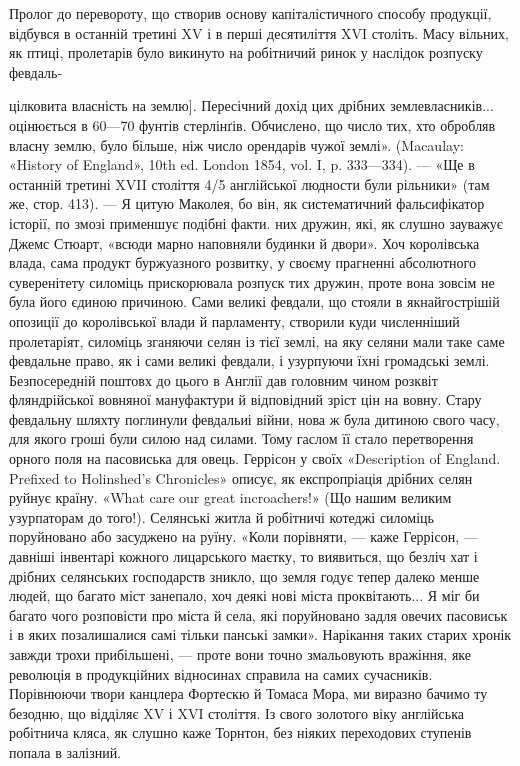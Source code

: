 Пролог до перевороту, що створив основу капіталістичного
способу продукції, відбувся в останній третині XV і в перші
десятиліття XVI століть. Масу вільних, як птиці, пролетарів
було викинуто на робітничий ринок у наслідок розпуску февдаль-

цілковита власність на землю]. Пересічний дохід цих дрібних землевласників...
оцінюється в 60—70 фунтів стерлінґів. Обчислено, що число
тих, хто обробляв власну землю, було більше, ніж число орендарів чужої
землі». (Macaulay: «History of England», 10th ed. London 1854,
vol. I, p. 333—334). — «Ще в останній третині XVII століття 4/5 англійської
людности були рільники» (там же, стор. 413). — Я цитую Маколея,
бо він, як систематичний фальсифікатор історії, по змозі применшує
подібні факти.
них дружин, які, як слушно зауважує Джемс Стюарт, «всюди
марно наповняли будинки й двори». Хоч королівська влада,
сама продукт буржуазного розвитку, у своєму прагненні абсолютного
суверенітету силоміць прискорювала розпуск тих дружин,
проте вона зовсім не була його єдиною причиною. Сами
великі февдали, що стояли в якнайгострішій опозиції до королівської
влади й парламенту, створили куди численніший пролетаріят,
силоміць зганяючи селян із тієї землі, на яку селяни
мали таке саме февдальне право, як і сами великі февдали, і
узурпуючи їхні громадські землі. Безпосередній поштовх до цього
в Англії дав головним чином розквіт фляндрійської вовняної
мануфактури й відповідний зріст цін на вовну. Стару февдальну
шляхту поглинули февдальиі війни, нова ж була дитиною свого
часу, для якого гроші були силою над силами. Тому гаслом її
стало перетворення орного поля на пасовиська для овець. Геррісон
у своїх «Description of England. Prefixed to Holinshed’s
Chronicles» описує, як експропріація дрібних селян руйнує
країну. «What care our great incroachers!» (Що нашим великим
узурпаторам до того!). Селянські житла й робітничі котеджі
силоміць поруйновано або засуджено на руїну. «Коли порівняти, —
каже Геррісон, — давніші інвентарі кожного лицарського маєтку,
то виявиться, що безліч хат і дрібних селянських господарств
зникло, що земля годує тепер далеко менше людей, що багато
міст занепало, хоч деякі нові міста проквітають... Я міг би багато
чого розповісти про міста й села, які поруйновано задля
овечих пасовиськ і в яких позалишалися самі тільки панські
замки». Нарікання таких старих хронік завжди трохи прибільшені,
— проте вони точно змальовують вражіння, яке революція
в продукційних відносинах справила на самих сучасників.
Порівнюючи твори канцлера Фортескю й Томаса Мора, ми виразно
бачимо ту безодню, що відділяє XV і XVI століття. Із свого
золотого віку англійська робітнича кляса, як слушно каже Торнтон,
без ніяких переходових ступенів попала в залізний.

